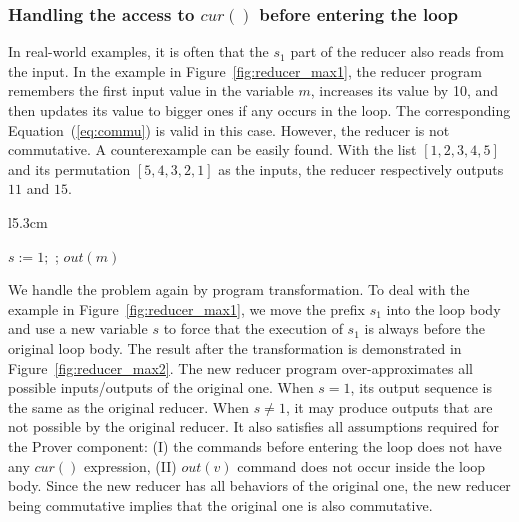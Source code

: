\documentclass{llncs}
\newcommand{\cur}{cur()}
\begin{document}
\subsubsection{Handling the access to $\cur$ before entering the loop} In real-world examples, it is often that the $s_1$ part of the reducer also reads from the input. In the example in Figure~\ref{fig:reducer_max1}, the reducer program remembers the first input value in the variable $m$, increases its value by 10, and then updates its value to bigger ones if any occurs in the loop. The corresponding Equation~(\ref{eq:commu}) is valid in this case. However, the reducer is not commutative. A counterexample can be easily found. With the list $[1,2,3,4,5]$ and its permutation $[5,4,3,2,1]$ as the inputs, the reducer respectively outputs $11$ and $15$.

\begin{wrapfigure}{l}{5.3cm}
	\vspace{-1cm}
	\begin{algorithm}[H]
		$s:=1;$\;
		\Loop{}{
			\uIf{$s=1$}{$m := \cur + 10; s:= 2$}
			\uElse{
				$t:=\cur$\;
				\uIf{ $t > m$}{
					$m := t$ \;
				}
			}
		};
		$out(m)$
	\end{algorithm}	
	\vspace{-0.4cm}
	\caption{Reducer max$^{+\mathtt{fix}}$}
	\vspace{-0.4cm}
	\label{fig:reducer_max2}
\end{wrapfigure}
We handle the problem again by program transformation. To deal with the example in Figure~\ref{fig:reducer_max1}, we move the prefix $s_1$ into the loop body and use a new variable $s$ to force that the execution of $s_1$ is always before the original loop body. The result after the transformation is demonstrated in Figure~\ref{fig:reducer_max2}. The new reducer program over-approximates all possible inputs/outputs of the original one. When $s=1$, its output sequence is the same as the original reducer. When $s\neq 1$, it may produce outputs that are not possible by the original reducer.
It also satisfies all assumptions required for the Prover component:
(I) the commands before entering the loop does not have any $\cur$ expression,
(II) $out(v)$ command does not occur inside the loop body.
Since the new reducer has all behaviors of the original one, the new reducer being commutative implies that the original one is also commutative.


%			
\end{document}
